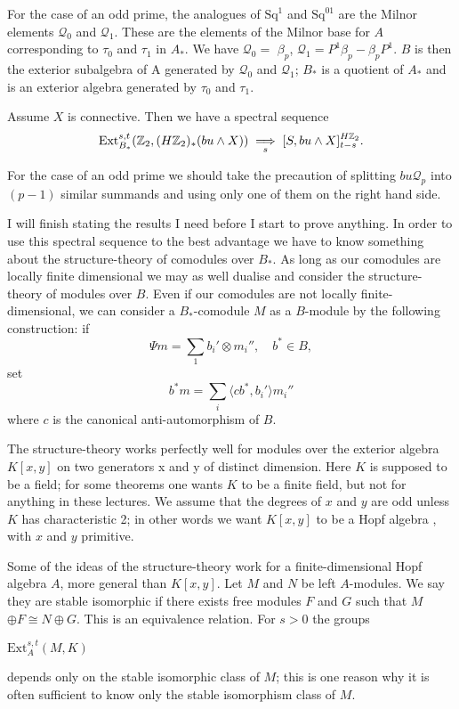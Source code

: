 \documentclass[../main]{subfiles}
\begin{document}
For the case of an odd prime, the analogues of $\mathrm{Sq}^{1}$ and $\mathrm{Sq}^{01}$ are the Milnor elements $\mathcal{Q}_{0}$ and $\mathcal{Q}_{1}$. These are the elements of the Milnor base for $A$ corresponding to $\tau_{0}$ and $\tau_{1}$ in $A_{\ast}$. We have $\mathcal{Q}_{0}=$ $\beta_{p}$, $\mathcal{Q}_{1}=P^{1}\beta_{p}-\beta_{p}P^{1}$. $B$ is then the exterior subalgebra of A generated by $\mathcal{Q}_{0}$ and $\mathcal{Q}_{1}$; $B_{\ast}$ is a quotient of $A_{\ast}$ and is an exterior algebra generated by $\tau_{0}$ and $\tau_{1}$.

\qquad \begin{proposition} \label{prop:p3ch16.1} Assume $X$ is connective. Then we have a spectral sequence
\begin{equation*}
    \mathrm{Ext}_{B_\ast}^{s,t} (\mathbb{Z}_2,(H\mathbb{Z}_2)_{\ast}(bu \wedge X)) \underset{s}{\implies} [S,bu \wedge X ]_{t-s}^{H\mathbb{Z}_2}.
\end{equation*}
\end{proposition}
    For the case of an odd prime we should take the precaution of splitting $bu\mathcal{Q}_{p}$ into $(p-1)$ similar summands and using only one of them on the right hand side.
    
    I will finish stating the results I need before I start to prove anything. In order to use this spectral sequence to the best advantage we have to know something about the structure-theory of comodules over $B_{\ast}$. As long as our comodules are locally finite dimensional we may as well dualise and consider the structure-theory of modules over $B$. Even if our comodules are not locally finite-dimensional, we can consider a $B_{\ast}$-comodule $M$ as a $B$-module by the following construction: if $$
        \Psi m= \sum_{1} b_{i}' \otimes m_{i}'', \quad b^{\ast} \in B , 
    $$
    set
    $$
        b^{\ast}m=\sum_{i} \langle cb^{\ast},b_{i}'\rangle m_{i}''
    $$
    where $c$ is the canonical anti-automorphism of $B$.
    
    The structure-theory works perfectly well for modules over the exterior algebra $K[x,y]$ on two generators x and y of distinct dimension. Here $K$ is supposed to be a field; for some theorems one wants $K$ to be a finite field, but not for anything in these lectures. We assume that the degrees of $x$ and $y$ are odd unless $K$ has characteristic 2; in other words we want $K[x,y]$ to be a Hopf algebra , with $x$ and $y$ primitive.
    
    Some of the ideas of the structure-theory work for a finite-dimensional Hopf algebra $A$, more general than $K[x,y]$. Let $M$ and $N$ be left $A$-modules. We say they are stable isomorphic if there exists free modules $F$ and $G$ such that $M$ $\oplus F \cong N \oplus G$. This is an equivalence relation. For $s>0$ the groups \begin{center}
         $\mathrm{Ext}_{A}^{s , t} (M,K)$
    \end{center}
    depends only on the stable isomorphic class of $M$; this is one reason why it is often sufficient to know only the stable isomorphism class of $M$. 
    
\end{document}
